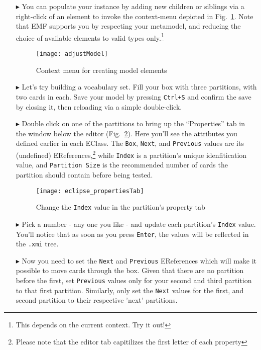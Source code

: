 \begin{itemize}
\clearpage

\item[$\blacktriangleright$] You can populate your instance by adding new children or siblings via a right-click of an element to invoke the
context-menu depicted in Fig.~\ref{fig:create_instance}. Note that EMF supports you by respecting your metamodel, and reducing the choice of available elements
to valid types only.\footnote{This depends on the current context. Try it out!}

\begin{figure}[htbp]
	\centering
  \texttt{[image: adjustModel]}
	\caption{Context menu for creating model elements}
	\label{fig:create_instance}
\end{figure}

\item[$\blacktriangleright$] Let's try building a vocabulary set. Fill your box with three partitions, with two cards in each. Save your model by pressing
\texttt{Ctrl+S} and confirm the save by closing it, then reloading via a simple double-click.

\item[$\blacktriangleright$] Double click on one of the partitions to bring up the ``Properties'' tab in the window below the editor
(Fig.~\ref{fig:properties_partition}). Here you'll see the attributes you defined earlier in each EClass. The \texttt{Box}, \texttt{Next}, and \texttt{Previous}
values are its (undefined) EReferences,\footnote{Please note that the editor tab capitilizes the first letter of each property} while \texttt{Index} is a
partition's unique idenfitication value, and \texttt{Partition Size} is the recommended number of cards the partition should contain before being tested.

\begin{figure}[h]
	\centering
  \texttt{[image: eclipse\_propertiesTab]}
	\caption{Change the \texttt{Index} value in the partition's property tab}
	\label{fig:properties_partition}
\end{figure}
\FloatBarrier

\vspace{0.5cm}

\item[$\blacktriangleright$] Pick a number - any one you like - and update each partition's \texttt{Index} value. You'll notice that as soon as you press
\texttt{Enter}, the values will be reflected in the \texttt{.xmi} tree.

\item[$\blacktriangleright$] Now you need to set the \texttt{Next} and \texttt{Previous} EReferences which will make it possible to move cards through the
box. Given that there are no partition before the first, set \texttt{Previous} values only for your second and third partition to that first partition.
Similarly, only set the \texttt{Next} values for the first, and second partition to their respective 'next' partitions.


\end{itemize}
